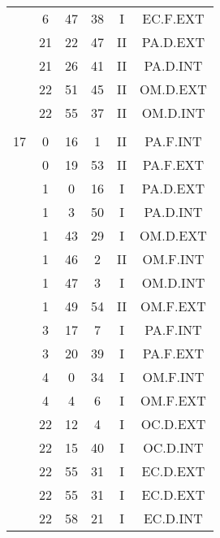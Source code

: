 \documentclass[12pt, a4paper]{article}
\begin{document}
\begin{multicols}{3}
{\begin{tabular}{c c c c c c}
	 	 	 	 & 6 & 47 & 38 & I & EC.F.EXT\\%
	 	 	 	 & 21 & 22 & 47 & II & PA.D.EXT\\%
	 	 	 	 & 21 & 26 & 41 & II & PA.D.INT\\%
	 	 	 	 & 22 & 51 & 45 & II & OM.D.EXT\\%
	 	 	 	 & 22 & 55 & 37 & II & OM.D.INT\\%
	 	 	 	 & & & & & \\%
	 	 	 	17 & 0 & 16 & 1 & II & PA.F.INT\\%
	 	 	 	 & 0 & 19 & 53 & II & PA.F.EXT\\%
	 	 	 	 & 1 & 0 & 16 & I & PA.D.EXT\\%
	 	 	 	 & 1 & 3 & 50 & I & PA.D.INT\\%
	 	 	 	 & 1 & 43 & 29 & I & OM.D.EXT\\%
	 	 	 	 & 1 & 46 & 2 & II & OM.F.INT\\%
	 	 	 	 & 1 & 47 & 3 & I & OM.D.INT\\%
	 	 	 	 & 1 & 49 & 54 & II & OM.F.EXT\\%
	 	 	 	 & 3 & 17 & 7 & I & PA.F.INT\\%
	 	 	 	 & 3 & 20 & 39 & I & PA.F.EXT\\%
	 	 	 	 & 4 & 0 & 34 & I & OM.F.INT\\%
	 	 	 	 & 4 & 4 & 6 & I & OM.F.EXT\\%
	 	 	 	 & 22 & 12 & 4 & I & OC.D.EXT\\%
	 	 	 	 & 22 & 15 & 40 & I & OC.D.INT\\%
	 	 	 	 & 22 & 55 & 31 & I & EC.D.EXT\\%
	 	 	 	 & 22 & 55 & 31 & I & EC.D.EXT\\%
	 	 	 	 & 22 & 58 & 21 & I & EC.D.INT\\%

\end{tabular}}
\end{multicols}
\end{document}
